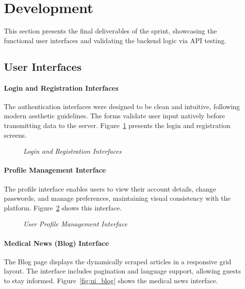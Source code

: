 \section{Development}
This section presents the final deliverables of the sprint, showcasing the functional user interfaces and validating the backend logic via API testing.

\subsection{User Interfaces}

\paragraph{Login and Registration Interfaces}
The authentication interfaces were designed to be clean and intuitive, following modern aesthetic guidelines. The forms validate user input natively before transmitting data to the server. Figure~\ref{fig:ui_login} presents the login and registration screens.

\begin{figure}[H]
    \centering
    \caption{\textit{Login and Registration Interfaces}}
    \label{fig:ui_login}
\end{figure}

\paragraph{Profile Management Interface}
The profile interface enables users to view their account details, change passwords, and manage preferences, maintaining visual consistency with the platform. Figure~\ref{fig:ui_profile} shows this interface.

\begin{figure}[H]
    \centering
    \caption{\textit{User Profile Management Interface}}
    \label{fig:ui_profile}
\end{figure}

\paragraph{Medical News (Blog) Interface}
The Blog page displays the dynamically scraped articles in a responsive grid layout. The interface includes pagination and language support, allowing guests to stay informed. Figure~\ref{fig:ui_blog} shows the medical news interface.

